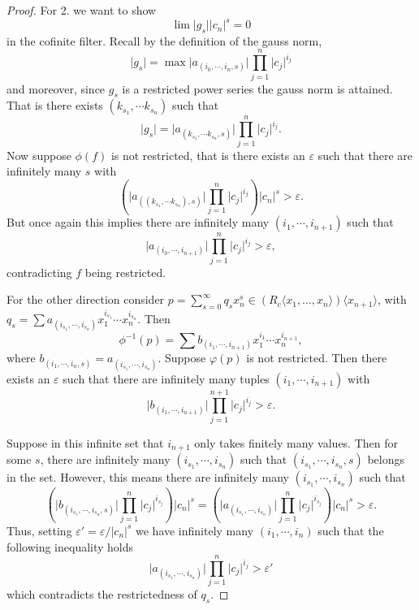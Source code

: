 \begin{proof}
For 2. we want to show
\[
  \lim \lvert g_s \rvert \lvert c_n \rvert^s = 0
\]
in the cofinite filter. Recall by the definition of the gauss norm,
\[
  \lvert g_s \rvert = \max \lvert a_{(i_0, \cdots, i_n, s)} \rvert \prod_{j=1}^{n} \lvert c_j \rvert ^{i_j}
\]
and moreover, since $g_s$ is a restricted power series the gauss norm is attained. That is
there exists $(k_{s_1}, \cdots k_{s_n})$ such that
\[
  \lvert g_s \rvert = \lvert a_{(k_{s_1}, \cdots k_{s_n}, s)} \rvert \prod_{j=1}^{n} \lvert c_j \rvert ^{i_j}.
\]
Now suppose $\phi (f)$ is not restricted, that is there exists an $\varepsilon$ such that there are
infinitely many $s$ with
\[
  \left( \lvert a_{((k_{s_1}, \cdots k_{s_n}), s)} \rvert \prod_{j=1}^{n} \lvert c_j \rvert ^{i_j} \right)
  \lvert c_n \rvert^s > \varepsilon.
\]
But once again this implies there are infinitely many $(i_1, \cdots, i_{n+1})$ such that
\[
  \lvert a_{(i_0, \cdots, i_{n + 1})} \rvert \prod_{j=1}^{n} \lvert c_j \rvert ^{i_j} > \varepsilon,
\]
contradicting $f$ being restricted.

For the other direction consider $p = \sum_{s = 0}^\infty q_s x_n^s \in
(R_c \langle x_1, \dots, x_n \rangle) \langle x_{n+1} \rangle$, with
$q_s = \sum a_{(i_{s_1}, \cdots, i_{s_n})} x_1^{i_{s_1}} \cdots x_n^{i_{s_n}}.$ Then
\[
  \phi^{-1} (p) = \sum b_{(i_1, \cdots, i_{n+1})} x_1^{i_1} \cdots x_n^{i_{n+1}},
\]
where $b_{(i_1, \cdots, i_n, s)} = a_{(i_{s_1}, \cdots, i_{s_n})}$.
Suppose $\varphi(p)$ is not restricted. Then there exists an $\varepsilon$ such that there are
infinitely many tuples $(i_1, \cdots, i_{n+1})$ with
\[
  \lvert b_{(i_1, \cdots, i_{n+1})} \rvert \prod_{j=1}^{n+1} \lvert c_j \rvert ^{i_j} > \varepsilon.
\]

Suppose in this infinite set that $i_{n+1}$ only takes finitely many values. Then for some $s$,
there are infinitely many $(i_{s_1}, \cdots, i_{s_n})$ such that $(i_{s_1}, \cdots, i_{s_n}, s)$
belongs in the set. However, this means there are infinitely many $(i_{s_1}, \cdots, i_{s_n})$ such that
\[
  \left( \lvert  b_{(i_{s_1}, \cdots, i_{s_n}, s)} \rvert \prod_{j=1}^{n} \lvert c_j \rvert ^{i_{s_j}} \right) \lvert c_n \rvert^s =
  \left( \lvert  a_{(i_{s_1}, \cdots, i_{s_n})} \rvert \prod_{j=1}^{n} \lvert c_j \rvert ^{i_{s_j}} \right) \lvert c_n \rvert^s > \varepsilon.
\]
Thus, setting $\varepsilon' = \varepsilon / \lvert c_n \rvert^s$ we have infinitely many
$(i_1, \cdots, i_n)$ such that the following inequality holds
\[
  \lvert  a_{(i_{s_1}, \cdots, i_{s_n})} \rvert \prod_{j=1}^{n} \lvert c_j \rvert ^{i_j} > \varepsilon'
\]
which contradicts the restrictedness of $q_s$.


\end{proof}
